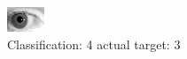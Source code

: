 \begin{figure}[h!]
\begin{center}
\includegraphics[width=0.60\columnwidth]{figures/ID217_class_4_target_3.png}
\end{center}
\caption{ Classification: 4 actual target: 3}
\label{fig:ID217_class_4_target_3}
\end{figure}
